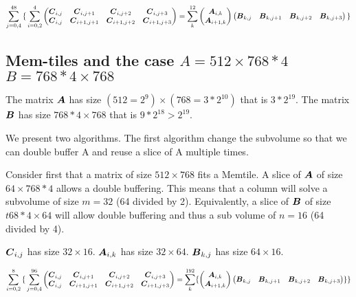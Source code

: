 \documentclass[journal]{IEEEtran}
\begin{document}
{\small \begin{equation*}
    \sum_{j=0,4}^{48}
    { \{} \sum_{i=0,2}^4
  \begin{pmatrix}
    {\boldsymbol C}_{i,j}  & {\boldsymbol C}_{i,j+1}    & {\boldsymbol C}_{i,j+2}    &{\boldsymbol C}_{i,j+3} \\
    {\boldsymbol C}_{i,j}  & {\boldsymbol C}_{i+1,j+1}   & {\boldsymbol C}_{i+1,j+2}  & {\boldsymbol C}_{i+1,j+3} \\
  \end{pmatrix}    = \sum_k^{12}
  \begin{pmatrix}
    {\boldsymbol A}_{i,k}  \\
    {\boldsymbol A}_{i+1,k}   \\
  \end{pmatrix}  
  \begin{pmatrix}
    {\boldsymbol B}_{k,j}  &  {\boldsymbol B}_{k,j+1}  & {\boldsymbol B}_{k,j+2}  &{\boldsymbol B}_{k,j+3} \\
  \end{pmatrix}
  { \}}    
\end{equation*}
}


\subsection{Mem-tiles and the case $A=512\times 768*4$ $B=768*4 \times 768$ }
The matrix ${\boldsymbol A}$ has size $(512=2^9) \times (768= 3*2^{10})$ that
is $3*2^{19}$.  The matrix ${\boldsymbol B}$ has size $768*4 \times 768$ that
is $9*2^{18}>2^{19}$.

We present two algorithms. The first algorithm change the subvolume so
that we can double buffer A and reuse a slice of A multiple times.

Consider first that a matrix of size $512 \times 768$ fits a Memtile.
A slice of ${\boldsymbol A}$ of size $64 \times 768*4$ allows a double
buffering. This means that a column will solve a subvolume of size
$m=32$ (64 divided by 2). Equivalently, a slice of ${\boldsymbol B}$ of size
$t68*4 \times 64$ will allow double buffering and thus a sub volume of
$n=16$ (64 divided by 4). 

${\boldsymbol C}_{i,j}$ has size $32 \times 16$.   ${\boldsymbol A}_{i,k}$ has size $32 \times 64$. ${\boldsymbol B}_{k,j}$ has size $64 \times 16$.      

{\small \begin{equation*}
    \sum_{i=0,2}^{8}
    { \{} \sum_{j=0,4}^{96}
  \begin{pmatrix}
    {\boldsymbol C}_{i,j}  & {\boldsymbol C}_{i,j+1}    & {\boldsymbol C}_{i,j+2}    &{\boldsymbol C}_{i,j+3} \\
    {\boldsymbol C}_{i,j}  & {\boldsymbol C}_{i+1,j+1}   & {\boldsymbol C}_{i+1,j+2}  & {\boldsymbol C}_{i+1,j+3} \\
  \end{pmatrix}    = \sum_k^{192}
  \{
  \begin{pmatrix}
    {\boldsymbol A}_{i,k}  \\
    {\boldsymbol A}_{i+1,k}   \\
  \end{pmatrix}  
  \begin{pmatrix}
    {\boldsymbol B}_{k,j}  &  {\boldsymbol B}_{k,j+1}  & {\boldsymbol B}_{k,j+2}  &{\boldsymbol B}_{k,j+3} \\
  \end{pmatrix}
  \}
  { \}}    
\end{equation*}
}
\end{document}
